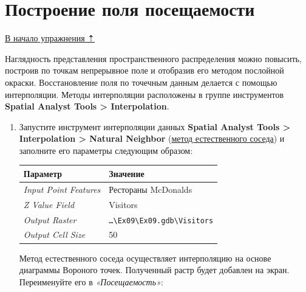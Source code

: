 \documentclass[12pt,]{book}
\begin{document}
\hypertarget{geocoding-field}{%
\section{Построение поля посещаемости}\label{geocoding-field}}

\protect\hyperlink{geocoding}{В начало упражнения ⇡}

Наглядность представления пространственного распределения можно повысить, построив по точкам непрерывное поле и отобразив его методом послойной окраски. Восстановление поля по точечным данным делается с помощью интерполяции. Методы интерполяции расположены в группе инструментов \textbf{Spatial Analyst Tools \textgreater{} Interpolation}.

\begin{enumerate}
\def\labelenumi{\arabic{enumi}.}
\item
  Запустите инструмент интерполяции данных \textbf{Spatial Analyst Tools \textgreater{} Interpolation \textgreater{} Natural Neighbor} (\href{http://desktop.arcgis.com/ru/arcmap/10.3/tools/spatial-analyst-toolbox/natural-neighbor.htm}{метод естественного соседа}) и заполните его параметры следующим образом:

  \begin{longtable}[]{@{}ll@{}}
  \toprule
  Параметр & Значение\tabularnewline
  \midrule
  \endhead
  \emph{Input Point Features} & Рестораны McDonalds\tabularnewline
  \emph{Z Value Field} & Visitors\tabularnewline
  \emph{Output Raster} & \texttt{\ldots{}\textbackslash{}Ex09\textbackslash{}Ex09.gdb\textbackslash{}Visitors}\tabularnewline
  \emph{Output Cell Size} & 50\tabularnewline
  \bottomrule
  \end{longtable}

  Метод естественного соседа осуществляет интерполяцию на основе диаграммы Вороного точек. Полученный растр будет добавлен на экран. Переименуйте его в \emph{«Посещаемость»}:


\end{enumerate}
\end{document}
